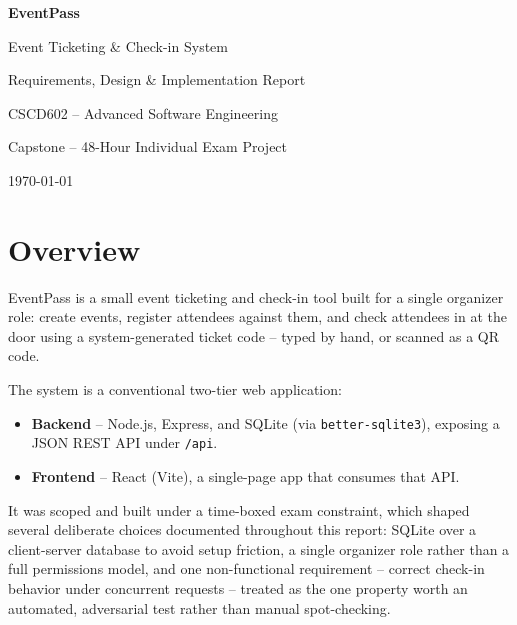 ﻿\documentclass[11pt,letterpaper]{report}
\newcommand{\code}[1]{\lstinline[breaklines=true]{#1}}
\begin{document}
\begin{titlepage}
  \centering
  \vspace*{3cm}
  {\Huge\bfseries EventPass\par}
  \vspace{0.5cm}
  {\Large Event Ticketing \& Check-in System\par}
  \vspace{1.5cm}
  {\large Requirements, Design \& Implementation Report\par}
  \vspace{2cm}
  {\large CSCD602 -- Advanced Software Engineering\par}
  {\large Capstone -- 48-Hour Individual Exam Project\par}
  \vfill
  {\large \today\par}
\end{titlepage}

\tableofcontents

\chapter{Overview}

EventPass is a small event ticketing and check-in tool built for a
single organizer role: create events, register attendees against them,
and check attendees in at the door using a system-generated ticket
code -- typed by hand, or scanned as a QR code.

The system is a conventional two-tier web application:

\begin{itemize}[leftmargin=1.5em]
  \item \textbf{Backend} -- Node.js, Express, and SQLite (via
    \code{better-sqlite3}), exposing a JSON REST API under \code{/api}.
  \item \textbf{Frontend} -- React (Vite), a single-page app that
    consumes that API.
\end{itemize}

It was scoped and built under a time-boxed exam constraint, which
shaped several deliberate choices documented throughout this report:
SQLite over a client-server database to avoid setup friction, a single
organizer role rather than a full permissions model, and one
non-functional requirement -- correct check-in behavior under
concurrent requests -- treated as the one property worth an automated,
adversarial test rather than manual spot-checking.
\end{document}
